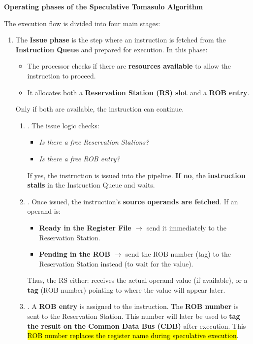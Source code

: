 \highspace
\begin{flushleft}
    \textcolor{Green3}{ \textbf{Operating phases of the Speculative Tomasulo Algorithm}}
\end{flushleft}
The execution flow is divided into four main stages:
\begin{enumerate}
    \item {}

    The \textbf{Issue phase} is the step where an instruction is fetched from the \textbf{Instruction Queue} and prepared for execution. In this phase:
    \begin{itemize}
        \item The processor checks if there are \textbf{resources available} to allow the instruction to proceed.
        \item It allocates both a \textbf{Reservation Station (RS) slot} and a \textbf{ROB entry}.
    \end{itemize}
    Only if both are available, the instruction can continue.
    \begin{enumerate}
        \item {}. The issue logic checks:
        \begin{itemize}
            \item \emph{Is there a free Reservation Stations?}
            \item \emph{Is there a free ROB entry?}
        \end{itemize}
        If yes, the instruction is issued into the pipeline. \textbf{If no}, the \textbf{instruction stalls} in the Instruction Queue and waits.
        \item {}. Once issued, the instruction's \textbf{source operands are fetched}. If an operand is:
        \begin{itemize}
            \item \textbf{Ready in the Register File} $\rightarrow$ send it immediately to the Reservation Station.
            \item \textbf{Pending in the ROB} $\rightarrow$ send the ROB number (tag) to the Reservation Station instead (to wait for the value).
        \end{itemize}
        Thus, the RS either: receives the actual operand value (if available), or a \textbf{tag} (ROB number) pointing to where the value will appear later.
        \item {}. A \textbf{ROB entry} is assigned to the instruction. The \textbf{ROB number} is sent to the Reservation Station. This number will later be used to \textbf{tag the result on the Common Data Bus (CDB)} after execution. This \hl{ROB number replaces the register name during speculative execution}.
    \end{enumerate}


\end{enumerate}
